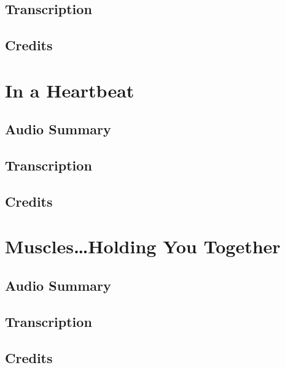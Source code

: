 \subsection{Transcription}

\subsection{Credits}

\section{In a Heartbeat}

\subsection{Audio Summary}

\subsection{Transcription}

\subsection{Credits}

\section{Muscles\dots Holding You Together}

\subsection{Audio Summary}

\subsection{Transcription}

\subsection{Credits}